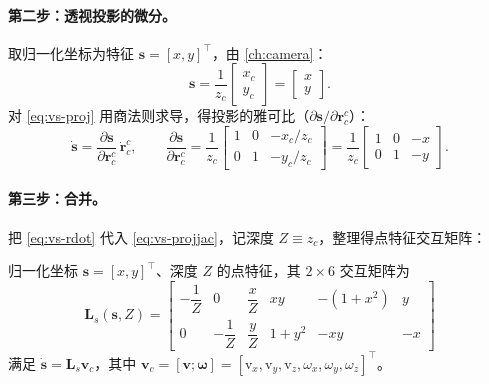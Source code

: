 \paragraph{第二步：透视投影的微分。}
取归一化坐标为特征 $\mathbf{s}=[x,y]^\top$，由 \cref{ch:camera}：
\begin{equation}
  \mathbf{s}=\frac{1}{z_c}\begin{bmatrix}x_c\\y_c\end{bmatrix}=\begin{bmatrix}x\\y\end{bmatrix}.
  \label{eq:vs-proj}
\end{equation}
对 \cref{eq:vs-proj} 用商法则求导，得投影的雅可比（$\partial\mathbf{s}/\partial\mathbf{r}_c^c$）：
\begin{equation}
  \dot{\mathbf{s}}=\frac{\partial\mathbf{s}}{\partial\mathbf{r}_c^c}\,\dot{\mathbf{r}}_c^c,
  \qquad
  \frac{\partial\mathbf{s}}{\partial\mathbf{r}_c^c}
  =\frac{1}{z_c}\begin{bmatrix}1&0&-x_c/z_c\\0&1&-y_c/z_c\end{bmatrix}
  =\frac{1}{z_c}\begin{bmatrix}1&0&-x\\0&1&-y\end{bmatrix}.
  \label{eq:vs-projjac}
\end{equation}

\paragraph{第三步：合并。}
把 \cref{eq:vs-rdot} 代入 \cref{eq:vs-projjac}，记深度 $Z\equiv z_c$，整理得点特征交互矩阵：
\begin{theorem}[点特征的交互矩阵]\label{thm:vs-point-interaction}
归一化坐标 $\mathbf{s}=[x,y]^\top$、深度 $Z$ 的点特征，其 $2\times6$ 交互矩阵为\cite{siciliano2009robotics,chaumette2006visual}
\begin{equation}
  \boxed{\;
  \mathbf{L}_s(\mathbf{s},Z)=
  \begin{bmatrix}
    -\dfrac{1}{Z} & 0 & \dfrac{x}{Z} & xy & -(1+x^2) & y\\[8pt]
    0 & -\dfrac{1}{Z} & \dfrac{y}{Z} & 1+y^2 & -xy & -x
  \end{bmatrix}\;}
  \label{eq:vs-Ls-point}
\end{equation}
满足 $\dot{\mathbf{s}}=\mathbf{L}_s\mathbf{v}_c$，其中 $\mathbf{v}_c=[\mathbf{v};\boldsymbol{\omega}]=[\mathrm{v}_x,\mathrm{v}_y,\mathrm{v}_z,\omega_x,\omega_y,\omega_z]^\top$。
\end{theorem}

